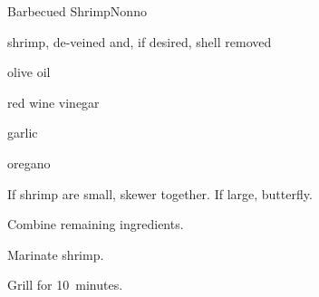 \begin{recipe}{Barbecued Shrimp}{Nonno}{}

\begin{ingredients}
\item shrimp, de-veined and, if desired, shell removed 
\item olive oil
\item red wine vinegar
\item garlic
\item oregano
\end{ingredients}

\begin{directions}
\item If shrimp are small, skewer together. If large, butterfly.
\item Combine remaining ingredients.
\item Marinate shrimp.
\item Grill for 10~minutes.
\end{directions}

\end{recipe}

